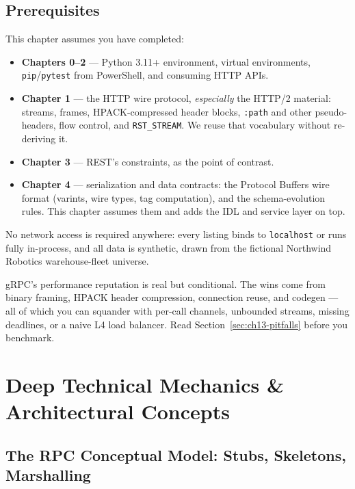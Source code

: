 \subsection*{Prerequisites}
This chapter assumes you have completed:

\begin{itemize}
  \item \textbf{Chapters 0--2} --- Python 3.11+ environment, virtual environments,
        \texttt{pip}/\texttt{pytest} from PowerShell, and consuming HTTP APIs.
  \item \textbf{Chapter 1} --- the HTTP wire protocol, \emph{especially} the
        HTTP/2 material: streams, frames, HPACK-compressed header blocks,
        \texttt{:path} and other pseudo-headers, flow control, and
        \texttt{RST\_STREAM}. We reuse that vocabulary without re-deriving it.
  \item \textbf{Chapter 3} --- REST's constraints, as the point of contrast.
  \item \textbf{Chapter 4} --- serialization and data contracts: the Protocol
        Buffers wire format (varints, wire types, tag computation), and the
        schema-evolution rules. This chapter assumes them and adds the IDL and
        service layer on top.
\end{itemize}

No network access is required anywhere: every listing binds to
\texttt{localhost} or runs fully in-process, and all data is synthetic, drawn
from the fictional Northwind Robotics warehouse-fleet universe.

\begin{warningbox}
gRPC's performance reputation is real but conditional. The wins come from
binary framing, HPACK header compression, connection reuse, and codegen --- all
of which you can squander with per-call channels, unbounded streams, missing
deadlines, or a naive L4 load balancer. Read Section~\ref{sec:ch13-pitfalls}
before you benchmark.
\end{warningbox}

\section{Deep Technical Mechanics \& Architectural Concepts}
\label{sec:ch13-mechanics}

\subsection{The RPC Conceptual Model: Stubs, Skeletons, Marshalling}
\label{subsec:ch13-rpc-model}


